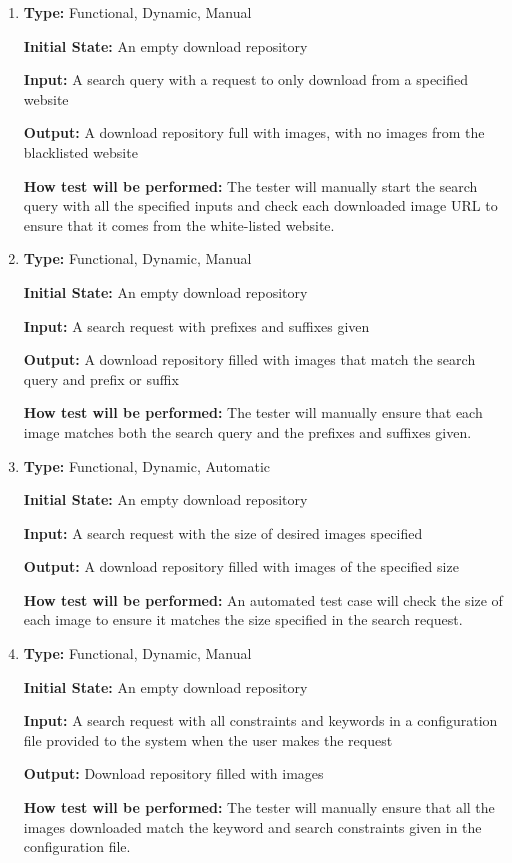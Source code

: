 \documentclass[12pt, titlepage]{article}
\begin{document}
\begin{enumerate}[label=FR-SQ\arabic*:, wide=0pt, leftmargin=*]
\item \phantom{empty}

\textbf{Type:} Functional, Dynamic, Manual
					
\textbf{Initial State:} An empty download repository
					
\textbf{Input:} A search query with a request to only download from a specified website
					
\textbf{Output:} A download repository full with images, with no images from the blacklisted website
					
\textbf{How test will be performed:} The tester will manually start the search query with all the specified inputs and check each downloaded image URL to ensure that it comes from the white-listed website.

\item \phantom{empty}

\textbf{Type:} Functional, Dynamic, Manual
					
\textbf{Initial State:} An empty download repository
					
\textbf{Input:} A search request with prefixes and suffixes given
					
\textbf{Output:} A download repository filled with images that match the search query and prefix or suffix
					
\textbf{How test will be performed:} The tester will manually ensure that each image matches both the search query and the prefixes and suffixes given.

\item \phantom{empty}

\textbf{Type:} Functional, Dynamic, Automatic
					
\textbf{Initial State:} An empty download repository
					
\textbf{Input:} A search request with the size of desired images specified
					
\textbf{Output:} A download repository filled with images of the specified size
					
\textbf{How test will be performed:} An automated test case will check the size of each image to ensure it matches the size specified in the search request.

\item \phantom{empty}

\textbf{Type:} Functional, Dynamic, Manual
					
\textbf{Initial State:} An empty download repository
					
\textbf{Input:} A search request with all constraints and keywords in a configuration file provided to the system when the user makes the request
					
\textbf{Output:} Download repository filled with images
					
\textbf{How test will be performed:} The tester will manually ensure that all the images downloaded match the keyword and search constraints given in the configuration file.

\end{enumerate}
\end{document}
